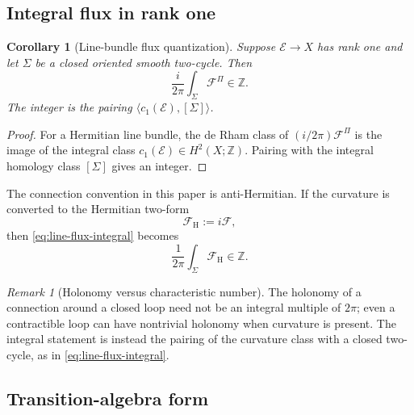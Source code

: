 \documentclass[11pt,reqno]{scrartcl}
\newcommand{\ZZ}{\mathbb Z}
\newcommand{\gaugeF}{\mathcal F}
\theoremstyle{plain}
\newtheorem{corollary}[corollary]{Corollary}
\theoremstyle{definition}
\theoremstyle{remark}
\newtheorem{remark}[remark]{Remark}
\begin{document}
\subsection{Integral flux in rank one}

\begin{corollary}[Line-bundle flux quantization]
\label{cor:line-flux}
Suppose \(\mathscr E\to X\) has rank one and let \(\Sigma\) be a closed
oriented smooth two-cycle.  Then
\begin{equation}
  \boxed{
  \frac{i}{2\pi}\int_\Sigma \gaugeF^\Pi\in\ZZ.}
  \label{eq:line-flux-integral}
\end{equation}
The integer is the pairing
\(\langle c_1(\mathscr E),[\Sigma]\rangle\).
\end{corollary}

\begin{proof}
For a Hermitian line bundle, the de Rham class of
\((i/2\pi)\gaugeF^\Pi\) is the image of the integral class
\(c_1(\mathscr E)\in H^2(X;\ZZ)\).  Pairing with the integral homology class
\([\Sigma]\) gives an integer.
\end{proof}

The connection convention in this paper is anti-Hermitian.  If the
curvature is converted to the Hermitian two-form
\begin{equation}
  \gaugeF_{\mathrm H}:=i\gaugeF,
\end{equation}
then \eqref{eq:line-flux-integral} becomes
\begin{equation}
  \frac{1}{2\pi}\int_\Sigma\gaugeF_{\mathrm H}\in\ZZ.
  \label{eq:physics-flux-integral}
\end{equation}

\begin{remark}[Holonomy versus characteristic number]
The holonomy of a connection around a closed loop need not be an integral
multiple of \(2\pi\); even a contractible loop can have nontrivial holonomy
when curvature is present.  The integral statement is instead the pairing of
the curvature class with a closed two-cycle, as in
\eqref{eq:line-flux-integral}.
\end{remark}

\subsection{Transition-algebra form}
\end{document}
